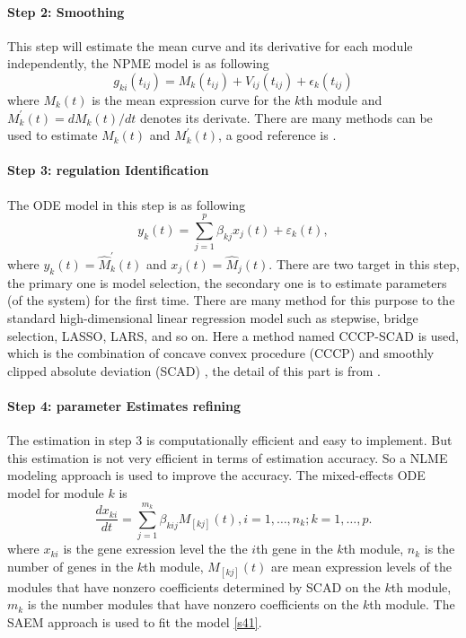 \documentclass[12pt]{extarticle}
\begin{document}
\paragraph{Step 2: Smoothing}
This step will estimate the mean curve and its derivative for each module independently, the NPME model is as following \cite{Wu02}
\begin{equation}
g_{ki}(t_{ij})=M_{k}(t_{ij})+V_{ij}(t_{ij})+\epsilon_{k}(t_{ij})
\end{equation}
where $M_{k}(t)$ is the mean expression curve for the $k$th module and $M_{k}^{'}(t)=dM_{k}(t)/dt$ denotes its derivate. There are many methods can be used to estimate $M_{k}(t)$ and $M_{k}^{'}(t)$, a good reference is \cite{Wu06}.
\paragraph{Step 3: regulation Identification}
The ODE model in this step is as following
\begin{equation}
y_{k}(t)=\sum_{j=1}^{p}\beta_{kj}x_{j}(t)+\varepsilon_{k}(t),
\end{equation}
where $y_{k}(t)=\hat{M}_{k}^{'}(t)$ and $x_{j}(t)=\hat{M}_{j}(t)$.
There are two target in this step, the primary one is model selection, the secondary one is to estimate parameters (of the system) for the first time. There are many method for this purpose to the standard high-dimensional linear regression model such as stepwise, bridge selection, LASSO, LARS, and so on. Here a method named CCCP-SCAD is used, which is the combination of concave convex procedure (CCCP) \cite{Le97} and smoothly clipped absolute deviation (SCAD) \cite{Fan01}, the detail of this part is from \cite{Kim08}.
\paragraph{Step 4: parameter Estimates refining}
The estimation in step 3 is computationally efficient and easy to implement. But this estimation is not very efficient in terms of estimation accuracy. So a NLME modeling approach is used to improve the accuracy.
The mixed-effects ODE model for module $k$ is
\begin{equation}
\frac{dx_{ki}}{dt}=\sum_{j=1}^{m_k}\beta_{kij}M_{[kj]}(t), i=1,\ldots,n_k; k=1,\ldots,p. \label{s41}
\end{equation}
where $x_{ki}$ is the gene exression level the the $i$th gene in the $k$th module, $n_k$ is the number of genes in the $k$th module, $M_{[kj]}(t)$ are mean expression levels of the modules that have nonzero coefficients determined by SCAD on the $k$th module, $m_k$ is the number modules that have nonzero coefficients on the $k$th module.
The SAEM approach \cite{Delyon99} is used to fit the model \eqref{s41}.
\end{document}
